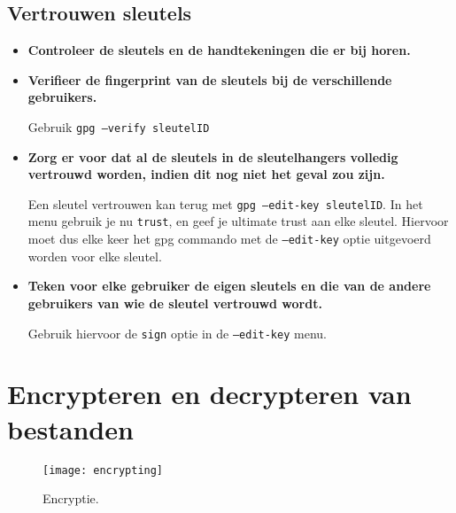 \documentclass{report}
\begin{document}
\subsection{Vertrouwen sleutels}
\begin{itemize}
	\item \textbf{Controleer de sleutels en de handtekeningen die er bij horen.}
	\item \textbf{Verifieer de fingerprint van de sleutels bij de verschillende gebruikers.}
	
	Gebruik \texttt{gpg --verify sleutelID}
	\item \textbf{Zorg er voor dat al de sleutels in de sleutelhangers volledig vertrouwd worden, indien dit nog niet het geval zou zijn.}
	
	Een sleutel vertrouwen kan terug met \texttt{gpg --edit-key sleutelID}.
	In het menu gebruik je nu \texttt{trust}, en geef je ultimate trust aan elke sleutel. Hiervoor moet dus elke keer het gpg commando met de \texttt{--edit-key} optie uitgevoerd worden voor elke sleutel.
	\item \textbf{Teken voor elke gebruiker de eigen sleutels en die van de andere gebruikers van wie de sleutel vertrouwd wordt.}
	
	Gebruik hiervoor de \texttt{sign} optie in de \texttt{--edit-key} menu.
\end{itemize}

\section{Encrypteren en decrypteren van bestanden}
\begin{figure}[h]
	\texttt{[image: encrypting]}
	\caption{Encryptie.}
	\label{fig:encrypting}
\end{figure}
\end{document}
